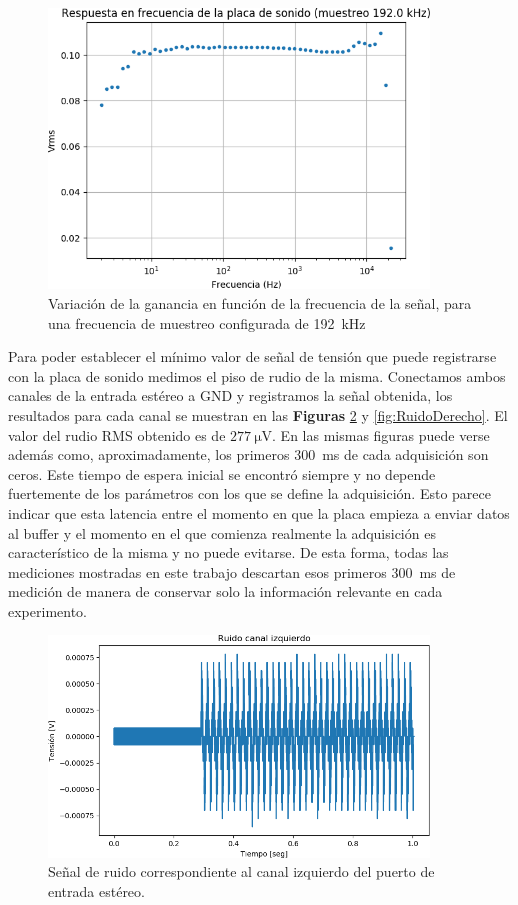 \documentclass[a4paper,11pt]{article}
\begin{document}
	\begin{figure}[!h]
		\centering
		\includegraphics[width=0.9\textwidth]{imagenes/bode192kHz.png}
		\caption{Variación de la ganancia en función de la frecuencia de
la señal, para una frecuencia de muestreo configurada de \SI{192}{\kHz}}
        \label{fig:bode192k}
	\end{figure}

Para poder establecer el mínimo valor de señal de tensión que puede
registrarse con la placa de sonido medimos el piso de rudio de la misma.
Conectamos ambos canales de la entrada estéreo a GND y registramos la
señal obtenida, los resultados para cada canal se muestran en las
\textbf{Figuras} \ref{fig:RuidoIzquierdo} y \ref{fig:RuidoDerecho}.
El valor del rudio RMS obtenido es de $\SI{277}{\uV}$. En las mismas figuras puede verse además como, aproximadamente, los primeros \SI{300}{\milli\second} de cada adquisición son ceros. Este tiempo de espera inicial se encontró siempre y no depende fuertemente de los parámetros con los que se define la adquisición. Esto parece indicar que esta latencia entre el momento en que la placa empieza a enviar datos al buffer y el momento en el que comienza realmente la adquisición es característico de la misma y no puede evitarse. De esta forma, todas las mediciones mostradas en este trabajo descartan esos primeros \SI{300}{\milli\second} de medición de manera de conservar solo la información relevante en cada experimento.  

	\begin{figure}[h]
		\centering
		\includegraphics[width=0.9\textwidth]{imagenes/RuidoCanalIzquierdo.png}
		\caption{Señal de ruido correspondiente al canal izquierdo del
puerto de entrada estéreo.}
        \label{fig:RuidoIzquierdo}
	\end{figure}
	
\end{document}

